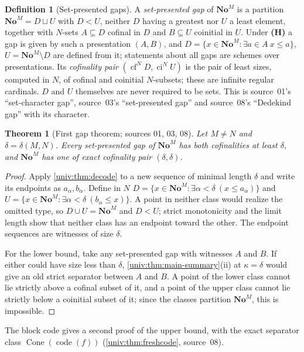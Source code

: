 \documentclass[11pt,letterpaper]{article}
\numberwithin{equation}{section}
\newtheorem{theorem}{Theorem}[section]
\theoremstyle{definition}
\newtheorem{definition}[definition]{Definition}
\theoremstyle{remark}
\newcommand{\No}{\mathbf{No}}
\newcommand{\NoM}{\No^{M}}
\newcommand{\cf}{\operatorname{cf}}
\newcommand{\ci}{\operatorname{ci}}
\newcommand{\Cone}{\operatorname{Cone}}
\newcommand{\code}{\operatorname{code}}
\begin{document}
\begin{definition}[Set-presented gaps]\label{univ:def:setgap}
A \emph{set-presented gap} of $\NoM$ is a partition $\NoM=D\sqcup U$ with
$D<U$, neither $D$ having a greatest nor $U$ a least element, together with
$N$-sets $A\subseteq D$ cofinal in $D$ and $B\subseteq U$ coinitial in $U$.
Under \textbf{(H)} a gap is given by such a presentation $(A,B)$, and
$D=\{x\in\NoM:\exists a\in A\ x\le a\}$, $U=\NoM\setminus D$ are defined from
it; statements about all gaps are schemes over presentations. Its
\emph{cofinality pair} $(\cf^N D,\ci^N U)$ is the pair of least sizes, computed
in $N$, of cofinal and coinitial $N$-subsets; these are infinite regular
cardinals. $D$ and $U$ themselves are never required to be sets. This is
source~01's ``set-character gap'', source~03's ``set-presented gap'' and
source~08's ``Dedekind gap'' with its character.
\end{definition}

\begin{theorem}[First gap theorem; sources 01, 03, 08]\label{univ:thm:firstgap}
Let $M\ne N$ and $\delta=\delta(M,N)$. Every set-presented gap of $\NoM$ has
both cofinalities at least $\delta$, and $\NoM$ has one of exact cofinality
pair $(\delta,\delta)$.
\end{theorem}
\begin{proof}
Apply \cref{univ:thm:decode} to a new sequence of minimal length $\delta$ and
write its endpoints as $a_\alpha,b_\alpha$. Define in $N$
$D=\{x\in\NoM:\exists\alpha<\delta\ (x\leq a_\alpha)\}$ and
$U=\{x\in\NoM:\exists\alpha<\delta\ (b_\alpha\leq x)\}$. A point in neither
class would realize the omitted type, so $D\cup U=\NoM$ and $D<U$; strict
monotonicity and the limit length show that neither class has an endpoint
toward the other. The endpoint sequences are witnesses of size $\delta$.

For the lower bound, take any set-presented gap with witnesses $A$ and $B$.
If either could have size less than $\delta$,
\cref{univ:thm:main-summary}(ii) at $\kappa=\delta$ would give an old strict
separator between $A$ and $B$. A point of the lower class cannot lie strictly
above a cofinal subset of it, and a point of the upper class cannot lie
strictly below a coinitial subset of it; since the classes partition $\NoM$,
this is impossible.
\end{proof}

The block code gives a second proof of the upper bound, with the exact
separator class $\Cone(\code(f))$ (\cref{univ:thm:freshcode}, source~08).
\end{document}
